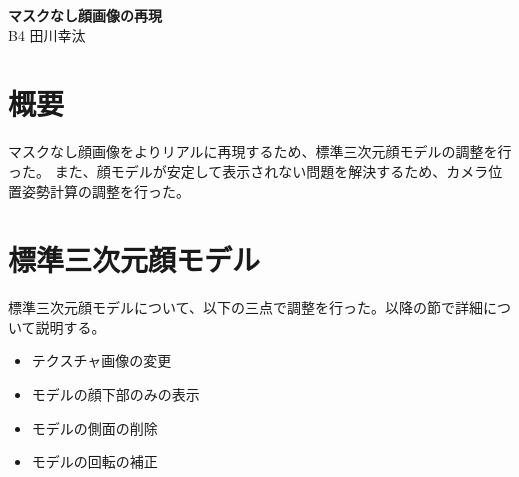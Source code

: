 \documentclass[]{jarticle}          %
\begin{document}

\vspace*{2ex}
\begin{center}
 {\Large \bf マスクなし顔画像の再現}\\ %
 \vspace*{5mm}
 {\large B4 田川幸汰}%
\end{center}






\section{概要}
 マスクなし顔画像をよりリアルに再現するため、標準三次元顔モデルの調整を行った。
また、顔モデルが安定して表示されない問題を解決するため、カメラ位置姿勢計算の調整を行った。

\section{標準三次元顔モデル}
 標準三次元顔モデルについて、以下の三点で調整を行った。以降の節で詳細について説明する。
\begin{itemize}
  \item テクスチャ画像の変更
  \item モデルの顔下部のみの表示
  \item モデルの側面の削除
  \item モデルの回転の補正
\end{itemize}
\end{document}
